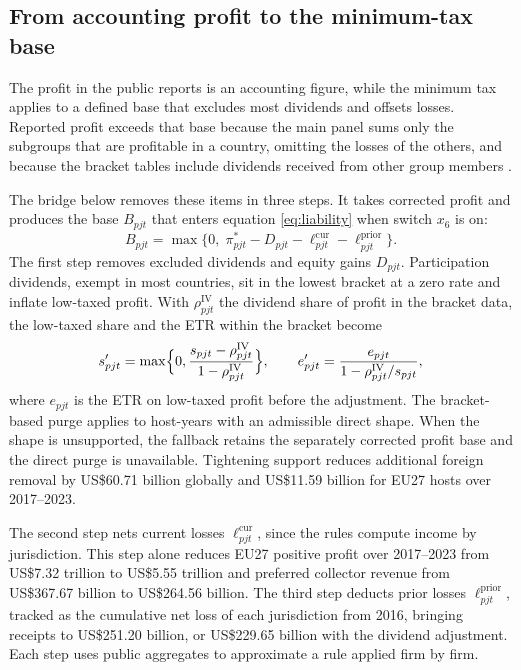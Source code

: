 \documentclass[11pt,a4paper]{article}
\newcommand{\usd}{US\$}
\begin{document}
\subsection{From accounting profit to the minimum-tax base}\label{sec:accounting_bridge}

The profit in the public reports is an accounting figure, while the minimum tax applies to a defined base that excludes most dividends and offsets losses. Reported profit exceeds that base because the main panel sums only the subgroups that are profitable in a country, omitting the losses of the others, and because the bracket tables include dividends received from other group members \citep{hanlon2023,oecd2025}.

The bridge below removes these items in three steps. It takes corrected profit and produces the base $B_{pjt}$ that enters equation \eqref{eq:liability} when switch $x_6$ is on:
\begin{equation}\label{eq:bridge}
B_{pjt}=\max\bigl\{0,\;\pi^{*}_{pjt}-D_{pjt}-\ell^{\mathrm{cur}}_{pjt}-\ell^{\mathrm{prior}}_{pjt}\bigr\}.
\end{equation}
The first step removes excluded dividends and equity gains $D_{pjt}$. Participation dividends, exempt in most countries, sit in the lowest bracket at a zero rate and inflate low-taxed profit. With $\rho^{\mathrm{IV}}_{pjt}$ the dividend share of profit in the bracket data, the low-taxed share and the ETR within the bracket become
\begin{equation}\label{eq:purge}
s'_{pjt}=\max\Bigl\{0,\frac{s_{pjt}-\rho^{\mathrm{IV}}_{pjt}}{1-\rho^{\mathrm{IV}}_{pjt}}\Bigr\},\qquad
e'_{pjt}=\frac{e_{pjt}}{1-\rho^{\mathrm{IV}}_{pjt}/s_{pjt}},
\end{equation}
where $e_{pjt}$ is the ETR on low-taxed profit before the adjustment. The bracket-based purge applies to host-years with an admissible direct shape. When the shape is unsupported, the fallback retains the separately corrected profit base and the direct purge is unavailable. Tightening support reduces additional foreign removal by \usd60.71 billion globally and \usd11.59 billion for EU27 hosts over 2017–2023.

The second step nets current losses $\ell^{\mathrm{cur}}_{pjt}$, since the rules compute income by jurisdiction. This step alone reduces EU27 positive profit over 2017–2023 from \usd7.32 trillion to \usd5.55 trillion and preferred collector revenue from \usd367.67 billion to \usd264.56 billion. The third step deducts prior losses $\ell^{\mathrm{prior}}_{pjt}$, tracked as the cumulative net loss of each jurisdiction from 2016, bringing receipts to \usd251.20 billion, or \usd229.65 billion with the dividend adjustment. Each step uses public aggregates to approximate a rule applied firm by firm.
\end{document}

